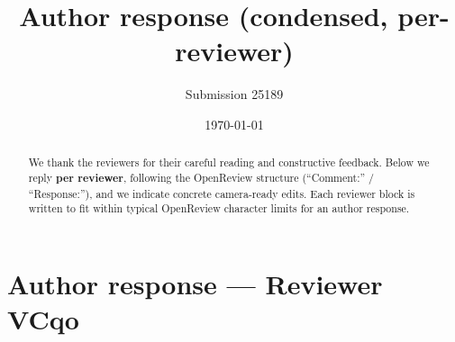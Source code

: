 \documentclass[11pt,a4paper]{article}
\title{Author response (condensed, per-reviewer)}
\author{Submission 25189}
\date{\today}
\begin{document}
\maketitle

\begin{abstract}
\noindent
We thank the reviewers for their careful reading and constructive feedback. Below we reply \textbf{per reviewer}, following the OpenReview structure (``Comment:'' / ``Response:''), and we indicate concrete camera-ready edits. Each reviewer block is written to fit within typical OpenReview character limits for an author response.
\end{abstract}

\section*{Author response --- Reviewer VCqo}
\end{document}
